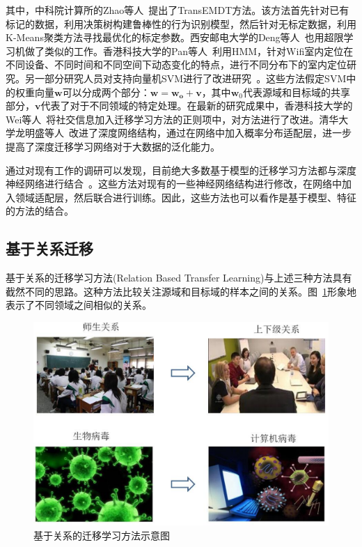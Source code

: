 其中，中科院计算所的Zhao等人~\cite{zhao2011cross}提出了TransEMDT方法。该方法首先针对已有标记的数据，利用决策树构建鲁棒性的行为识别模型，然后针对无标定数据，利用K-Means聚类方法寻找最优化的标定参数。西安邮电大学的Deng等人~\cite{deng2014cross}也用超限学习机做了类似的工作。香港科技大学的Pan等人~\cite{pan2008transfer}利用HMM，针对Wifi室内定位在不同设备、不同时间和不同空间下动态变化的特点，进行不同分布下的室内定位研究。另一部分研究人员对支持向量机SVM进行了改进研究~\cite{nater2011transferring,li2012cross}。这些方法假定SVM中的权重向量$\mathbf{w}$可以分成两个部分：$\mathbf{w}=\mathbf{w_o}+\mathbf{v}$，其中$\mathbf{w}_0$代表源域和目标域的共享部分，$\mathbf{v}$代表了对于不同领域的特定处理。在最新的研究成果中，香港科技大学的Wei等人~\cite{wei2016instilling}将社交信息加入迁移学习方法的正则项中，对方法进行了改进。清华大学龙明盛等人~\cite{long2015learning,long2016deep,long2017deep}改进了深度网络结构，通过在网络中加入概率分布适配层，进一步提高了深度迁移学习网络对于大数据的泛化能力。

通过对现有工作的调研可以发现，目前绝大多数基于模型的迁移学习方法都与深度神经网络进行结合~\cite{long2015learning,long2016deep,long2017deep,tzeng2015simultaneous,long2016deep}。这些方法对现有的一些神经网络结构进行修改，在网络中加入领域适配层，然后联合进行训练。因此，这些方法也可以看作是基于模型、特征的方法的结合。

\subsection{基于关系迁移}

基于关系的迁移学习方法(Relation Based Transfer Learning)与上述三种方法具有截然不同的思路。这种方法比较关注源域和目标域的样本之间的关系。图~\ref{fig-method-relation}形象地表示了不同领域之间相似的关系。

\begin{figure}[htbp]
	\centering
	\includegraphics[scale=0.4]{./figures/fig-method-relation.pdf}
	\caption{基于关系的迁移学习方法示意图}
	\label{fig-method-relation}
\end{figure}

